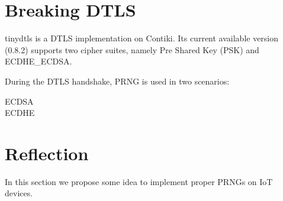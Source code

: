 \section{Breaking DTLS} \label{BreakDTLS}
tinydtls\cite{tinydtls} is a DTLS implementation on Contiki. Its current available version\cite{tinydtls082} (0.8.2) supports two cipher suites, namely Pre Shared Key (PSK) and ECDHE\_ECDSA\cite{rfc4492}. 

During the DTLS handshake, PRNG is used in two scenarios:
\begin{description}
	\item[ECDSA]
	\item[ECDHE]
\end{description}

\section{Reflection}
In this section we propose some idea to implement proper PRNGs on IoT devices.